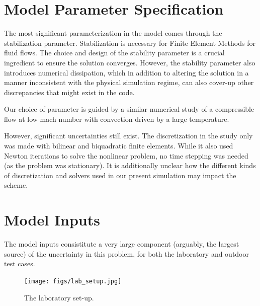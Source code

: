 \documentclass{article}
\begin{document}
%
% 
%
%
\section{Model Parameter Specification}

The most significant parameterization in the model comes through the
stabilization parameter. Stabilization is necessary for Finite Element
Methods for fluid flows\cite{franca1992stabilized}. The choice and
design of the stability parameter is a crucial ingredient to ensure the
solution converges. However, the stability parameter also introduces
numerical dissipation, which in addition to altering the solution in a
manner inconsistent with the physical simulation regime, can also
cover-up other discrepancies that might exist in the code. 

Our choice of parameter is guided by a similar numerical
study\cite{Becker2002428} of a compressible flow at low mach number with
convection driven by a large temperature. 

However, significant uncertainties still exist. The discretization in
the study only was made with bilinear and biquadratic finite elements. 
While it also used Newton iterations to solve the nonlinear problem, no
time stepping was needed (as the problem was stationary). It is
additionally unclear how the different kinds of discretization and
solvers used in our present simulation may impact the scheme.

%
%
%
\section{Model Inputs}

The model inputs consistitute a very large component (arguably, the
largest source) of the uncertainty in this problem, for both the
laboratory and outdoor test cases. 

  \begin{figure}[!htb]
    \begin{center}
     \texttt{[image: figs/lab\_setup.jpg]}
     \caption{The laboratory set-up.}
     \label{lab}
    \end{center}
  \end{figure}
\end{document}
